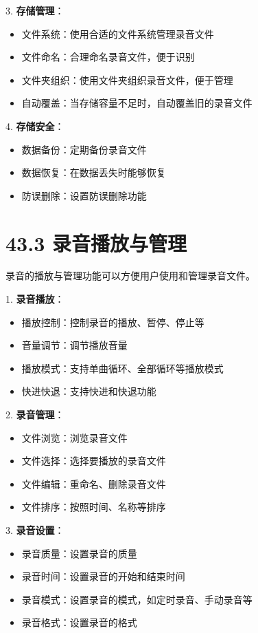 \documentclass[12pt,UTF8]{ctexbook}
\begin{document}
3. \textbf{存储管理}：
   \begin{itemize}[leftmargin=3.5em]
   \item 文件系统：使用合适的文件系统管理录音文件
   \item 文件命名：合理命名录音文件，便于识别
   \item 文件夹组织：使用文件夹组织录音文件，便于管理
   \item 自动覆盖：当存储容量不足时，自动覆盖旧的录音文件
   \end{itemize}

4. \textbf{存储安全}：
   \begin{itemize}[leftmargin=3.5em]
   \item 数据备份：定期备份录音文件
   \item 数据恢复：在数据丢失时能够恢复
   \item 防误删除：设置防误删除功能
   \end{itemize}

\section*{43.3 录音播放与管理}

录音的播放与管理功能可以方便用户使用和管理录音文件。

1. \textbf{录音播放}：
   \begin{itemize}[leftmargin=3.5em]
   \item 播放控制：控制录音的播放、暂停、停止等
   \item 音量调节：调节播放音量
   \item 播放模式：支持单曲循环、全部循环等播放模式
   \item 快进快退：支持快进和快退功能
   \end{itemize}

2. \textbf{录音管理}：
   \begin{itemize}[leftmargin=3.5em]
   \item 文件浏览：浏览录音文件
   \item 文件选择：选择要播放的录音文件
   \item 文件编辑：重命名、删除录音文件
   \item 文件排序：按照时间、名称等排序
   \end{itemize}

3. \textbf{录音设置}：
   \begin{itemize}[leftmargin=3.5em]
   \item 录音质量：设置录音的质量
   \item 录音时间：设置录音的开始和结束时间
   \item 录音模式：设置录音的模式，如定时录音、手动录音等
   \item 录音格式：设置录音的格式
   \end{itemize}
\end{document}
